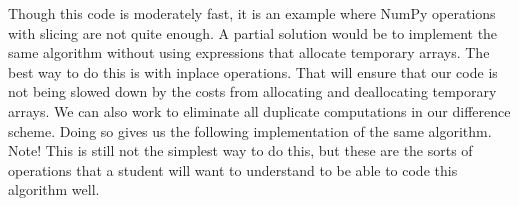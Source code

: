 Though this code is moderately fast, it is an example where NumPy operations with slicing are not quite enough.
A partial solution would be to implement the same algorithm without using expressions that allocate temporary arrays.
The best way to do this is with inplace operations.
That will ensure that our code is not being slowed down by the costs from allocating and deallocating temporary arrays.
We can also work to eliminate all duplicate computations in our difference scheme.
Doing so gives us the following implementation of the same algorithm.
Note! This is still not the simplest way to do this, but these are the sorts of operations that a student will want to understand to be able to code this algorithm well.


